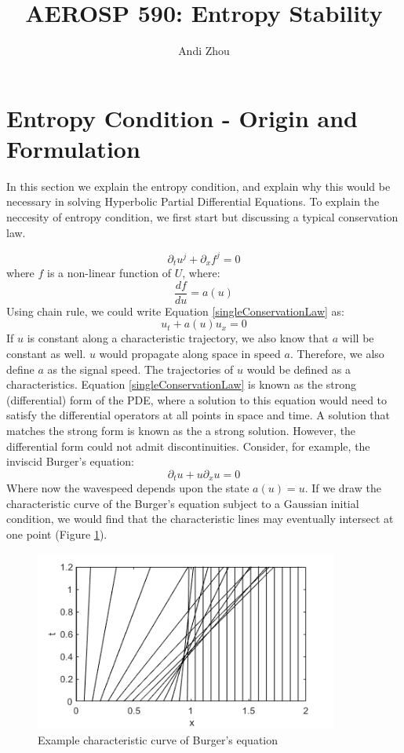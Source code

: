\documentclass[a4paper]{article}
\title{AEROSP 590: Entropy Stability}
\author{Andi Zhou}
\numberwithin{equation}{section}
\begin{document}
\maketitle

\section{Entropy Condition - Origin and Formulation}
In this section we explain the entropy condition, and explain why this would be necessary in solving Hyperbolic Partial Differential Equations. To explain the neccesity of entropy condition, we first start but discussing a typical conservation law.

\begin{equation} \label{singleConservationLaw}
    \partial_t u^j + \partial_x f^j = 0
\end{equation}
where $f$ is a non-linear function of $U$, where:
\begin{equation}
    \frac{df}{du} = a(u)
\end{equation}
Using chain rule, we could write Equation \ref{singleConservationLaw} as:
\begin{equation}\label{singleConservationLaw_wavespeed}
    u_t + a(u)u_x = 0
\end{equation}
If $u$ is constant along a characteristic trajectory, we also know that $a$ will be constant as well. $u$ would propagate along space in speed $a$. Therefore, we also define $a$ as the signal speed. The trajectories of $u$ would be defined as a characteristics. Equation \ref{singleConservationLaw} is known as the strong (differential) form of the PDE, where a solution to this equation would need to satisfy the differential operators at all points in space and time. A solution that matches the strong form is known as the a strong solution. However, the differential form could not admit discontinuities. Consider, for example, the inviscid Burger's equation:
\begin{equation}
    \partial_t u + u \partial_x u = 0
\end{equation}
Where now the wavespeed depends upon the state $a(u) = u$. If we draw the characteristic curve of the Burger's equation subject to a Gaussian initial condition, we would find that the characteristic lines may eventually intersect at one point (Figure \ref{BurgerEquationFigure}). 
\begin{figure}[H]
    \centering
    \includegraphics[width=10cm]{fig/BurgersCharacteristic.png}
    \caption{Example characteristic curve of Burger's equation}
    \label{BurgerEquationFigure}
\end{figure}
\end{document}
